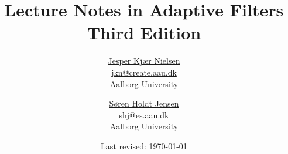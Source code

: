 


\title{Lecture Notes in Adaptive Filters\\{\large Third Edition}}
\author{\href{http://kom.aau.dk/~jkn}{Jesper Kjær Nielsen}\\\url{jkn@create.aau.dk}\\Aalborg University \and \href{http://kom.aau.dk/~shj}{Søren Holdt Jensen}\\\url{shj@es.aau.dk}\\Aalborg University}
\date{Last revised: \today}

  \pagestyle{empty} %
  \maketitle
  
  \cleardoublepage
  \pagestyle{fancy} %
  \tableofcontents
  \listoftodos
  \cleardoublepage
  
  \cleardoublepage
  
  
  
  
  
  \appendix
  
  


